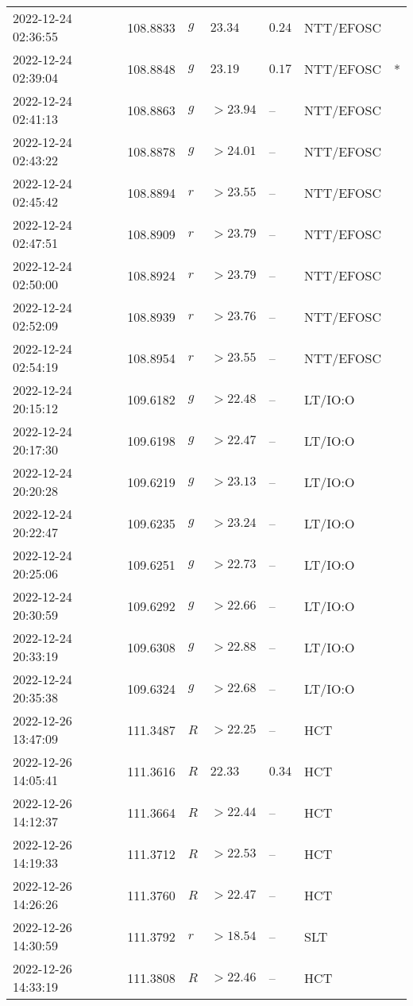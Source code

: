 \documentclass{nature_plusfigure}
\begin{document}
\begin{supplement}
\begin{center}
\begin{longtable}{lllllll}
2022-12-24 02:36:55 & 108.8833 & $g$ & $23.34$ & $0.24$ & NTT/EFOSC &  \\ 
2022-12-24 02:39:04 & 108.8848 & $g$ & $23.19$ & $0.17$ & NTT/EFOSC & * \\ 
2022-12-24 02:41:13 & 108.8863 & $g$ & $>23.94$ & -- & NTT/EFOSC &  \\ 
2022-12-24 02:43:22 & 108.8878 & $g$ & $>24.01$ & -- & NTT/EFOSC &  \\ 
2022-12-24 02:45:42 & 108.8894 & $r$ & $>23.55$ & -- & NTT/EFOSC &  \\ 
2022-12-24 02:47:51 & 108.8909 & $r$ & $>23.79$ & -- & NTT/EFOSC &  \\ 
2022-12-24 02:50:00 & 108.8924 & $r$ & $>23.79$ & -- & NTT/EFOSC &  \\ 
2022-12-24 02:52:09 & 108.8939 & $r$ & $>23.76$ & -- & NTT/EFOSC &  \\ 
2022-12-24 02:54:19 & 108.8954 & $r$ & $>23.55$ & -- & NTT/EFOSC &  \\ 
2022-12-24 20:15:12 & 109.6182 & $g$ & $>22.48$ & -- & LT/IO:O &  \\ 
2022-12-24 20:17:30 & 109.6198 & $g$ & $>22.47$ & -- & LT/IO:O &  \\ 
2022-12-24 20:20:28 & 109.6219 & $g$ & $>23.13$ & -- & LT/IO:O &  \\ 
2022-12-24 20:22:47 & 109.6235 & $g$ & $>23.24$ & -- & LT/IO:O &  \\ 
2022-12-24 20:25:06 & 109.6251 & $g$ & $>22.73$ & -- & LT/IO:O &  \\ 
2022-12-24 20:30:59 & 109.6292 & $g$ & $>22.66$ & -- & LT/IO:O &  \\ 
2022-12-24 20:33:19 & 109.6308 & $g$ & $>22.88$ & -- & LT/IO:O &  \\ 
2022-12-24 20:35:38 & 109.6324 & $g$ & $>22.68$ & -- & LT/IO:O &  \\ 
2022-12-26 13:47:09 & 111.3487 & $R$ & $>22.25$ & -- & HCT &  \\ 
2022-12-26 14:05:41 & 111.3616 & $R$ & $22.33$ & $0.34$ & HCT &  \\ 
2022-12-26 14:12:37 & 111.3664 & $R$ & $>22.44$ & -- & HCT &  \\ 
2022-12-26 14:19:33 & 111.3712 & $R$ & $>22.53$ & -- & HCT &  \\ 
2022-12-26 14:26:26 & 111.3760 & $R$ & $>22.47$ & -- & HCT &  \\ 
2022-12-26 14:30:59 & 111.3792 & $r$ & $>18.54$ & -- & SLT &  \\ 
2022-12-26 14:33:19 & 111.3808 & $R$ & $>22.46$ & -- & HCT &  \\ 

\end{longtable}
\end{center}
\end{supplement}
\end{document}
